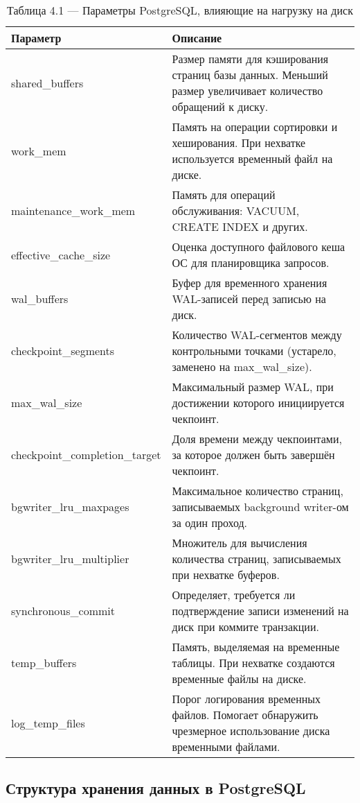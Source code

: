 \begin{table}[h!]
\centering
\caption*{Таблица 4.1 — Параметры PostgreSQL, влияющие на нагрузку на диск}
\vspace{0.5em}
\begin{tabular}{|L{0.3\textwidth}|L{0.6\textwidth}|}
\hline
\textbf{Параметр} & \textbf{Описание} \\
\hline
shared\_buffers & Размер памяти для кэширования страниц базы данных. Меньший размер увеличивает количество обращений к диску. \\
\hline
work\_mem & Память на операции сортировки и хеширования. При нехватке используется временный файл на диске. \\
\hline
maintenance\_work\_mem & Память для операций обслуживания: VACUUM, CREATE INDEX и других. \\
\hline
effective\_cache\_size & Оценка доступного файлового кеша ОС для планировщика запросов. \\
\hline
wal\_buffers & Буфер для временного хранения WAL-записей перед записью на диск. \\
\hline
checkpoint\_segments & Количество WAL-сегментов между контрольными точками (устарело, заменено на max\_wal\_size). \\
\hline
max\_wal\_size & Максимальный размер WAL, при достижении которого инициируется чекпоинт. \\
\hline
checkpoint\_completion\_target & Доля времени между чекпоинтами, за которое должен быть завершён чекпоинт. \\
\hline
bgwriter\_lru\_maxpages & Максимальное количество страниц, записываемых background writer-ом за один проход. \\
\hline
bgwriter\_lru\_multiplier & Множитель для вычисления количества страниц, записываемых при нехватке буферов. \\
\hline
synchronous\_commit & Определяет, требуется ли подтверждение записи изменений на диск при коммите транзакции. \\
\hline
temp\_buffers & Память, выделяемая на временные таблицы. При нехватке создаются временные файлы на диске. \\
\hline
log\_temp\_files & Порог логирования временных файлов. Помогает обнаружить чрезмерное использование диска временными файлами. \\
\hline
\end{tabular}
\end{table}


\subsection{Структура хранения данных в PostgreSQL}

